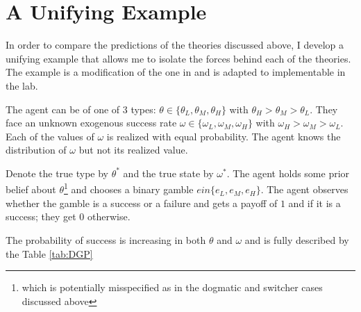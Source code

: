 \documentclass[
  12pt,
]{article}
\begin{document}
\hypertarget{a-unifying-example}{%
\section{A Unifying Example}\label{a-unifying-example}}

In order to compare the predictions of the theories discussed above, I
develop a unifying example that allows me to isolate the forces behind
each of the theories. The example is a modification of the one in
\citet{Heidhues2018} and is adapted to implementable in the lab.

The agent can be of one of 3 types:
\(\theta \in \{\theta_L, \theta_M, \theta_H\}\) with
\(\theta_H > \theta_M > \theta_L\). They face an unknown exogenous
success rate \(\omega \in \{\omega_L, \omega_M, \omega_H\}\) with
\(\omega_H>\omega_M>\omega_L\). Each of the values of \(\omega\) is
realized with equal probability. The agent knows the distribution of
\(\omega\) but not its realized value.

Denote the true type by \(\theta^*\) and the true state by \(\omega^*\).
The agent holds some prior belief about
\(\theta\)\footnote{which is potentially misspecified as in the dogmatic and switcher cases discussed above}
and chooses a binary gamble \(e in \{e_L, e_M, e_H\}\). The agent
observes whether the gamble is a success or a failure and gets a payoff
of \(1\) and if it is a success; they get \(0\) otherwise.

The probability of success is increasing in both \(\theta\) and
\(\omega\) and is fully described by the Table \ref{tab:DGP}
\end{document}
